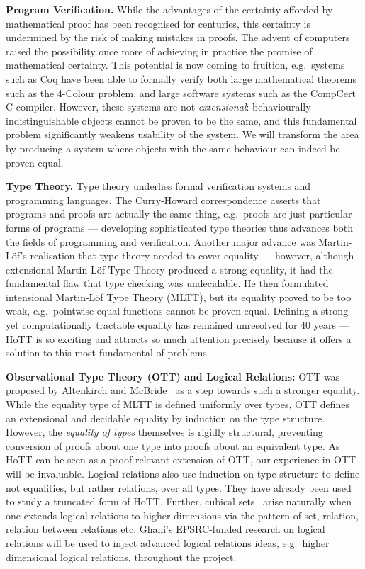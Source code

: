 \documentclass[a4paper,11pt]{article}
\newcommand{\eg}{{e.g.}\ }
\begin{document}
{\bf Program Verification.} While the advantages of the certainty
afforded by mathematical proof has been recognised for centuries, this
certainty is undermined by the risk of making mistakes in
proofs. The advent of computers raised the possibility once more of
achieving in practice the promise of mathematical certainty. This
potential is now coming to fruition, \eg systems such as Coq have been
able to formally verify both large mathematical theorems such as the
4-Colour problem, and large software systems such as the CompCert
C-compiler. However, these systems are not {\em extensional}:
behaviourally indistinguishable objects cannot be proven to be the
same, and this fundamental problem significantly weakens usability of the
system. We will transform the area by producing a system where
objects with the same behaviour can indeed be proven equal.


{\bf Type Theory.} Type theory underlies formal verification systems
and programming languages. The Curry-Howard correspondence asserts
that programs and proofs are actually the same thing, \eg proofs are
just particular forms of programs --- developing sophisticated type
theories thus advances both the fields of programming and
verification. Another major advance was Martin-L\"of's realisation
that type theory needed to cover equality --- however, although
extensional Martin-L\"of Type Theory produced a strong equality, it
had the fundamental flaw that type checking was undecidable. He then
formulated intensional Martin-L\"of Type Theory (MLTT), but its
equality proved to be too weak, \eg pointwise equal functions cannot
be proven equal. Defining a strong yet computationally tractable
equality has remained unresolved for 40 years --- HoTT is so exciting
and attracts so much attention precisely because it offers a solution
to this most fundamental of problems.

{\bf Observational Type Theory (OTT) and Logical Relations:} OTT was
proposed by Altenkirch and McBride~\cite{alti:ott-conf} as a step
towards such a stronger equality. While the equality type of MLTT is
defined uniformly over types, OTT defines an extensional and decidable
equality by induction on the type structure. However, the {\em
  equality of types} themselves is rigidly structural, preventing
conversion of proofs about one type into proofs about an equivalent
type. As HoTT can be seen as a proof-relevant extension of OTT, our
experience in OTT will be invaluable. Logical relations also use
induction on type structure to define not equalities, but rather
relations, over all types. They have already been
used~\cite{licataHarper:canonicity2d} to study a truncated form of
HoTT. Further, cubical sets~\cite{BezemM:cubsmt} arise naturally when
one extends logical relations to higher dimensions via the pattern of
set, relation, relation between relations etc. Ghani's EPSRC-funded
research on logical relations will be used to inject advanced logical
relations ideas, \eg higher dimensional logical relations, throughout
the project.
\end{document}
